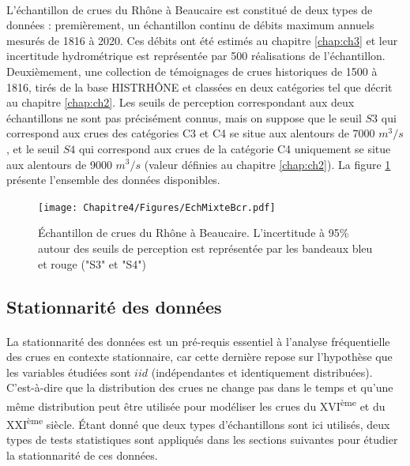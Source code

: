 	\paragraph{} L'échantillon de crues du Rhône à Beaucaire est constitué de deux types de données : premièrement, un échantillon continu de débits maximum annuels mesurés de 1816 à 2020. Ces débits ont été estimés au chapitre \ref{chap:ch3} et leur incertitude hydrométrique est représentée par 500 réalisations de l'échantillon. Deuxièmement, une collection de témoignages de crues historiques de 1500 à 1816, tirés de la base HISTRHÔNE et classées en deux catégories tel que décrit au chapitre \ref{chap:ch2}. Les seuils de perception correspondant aux deux échantillons ne sont pas précisément connus, mais on suppose que le seuil $S3$ qui correspond aux crues des catégories C3 et C4 se situe aux alentours de 7000 $m^3/s$, et le seuil $S4$ qui correspond aux crues de la catégorie C4 uniquement se situe aux alentours de 9000 $m^3/s$ (valeur définies au chapitre \ref{chap:ch2}). La figure \ref{fig:EchMixte} présente l'ensemble des données disponibles. 
	
	\begin{figure}[h]
		\texttt{[image: Chapitre4/Figures/EchMixteBcr.pdf]}	
		\caption{Échantillon de crues du Rhône à Beaucaire. L'incertitude à 95\% autour des seuils de perception est représentée par les bandeaux bleu et rouge ("S3" et "S4")}
		\label{fig:EchMixte}
	\end{figure}
	
\newpage
	\subsection{Stationnarité des données}
	\label{subsec:homog}
	\paragraph{} La stationnarité des données est un pré-requis essentiel à l'analyse fréquentielle des crues en contexte stationnaire, car cette dernière repose sur l'hypothèse que les variables étudiées sont $iid$ (indépendantes et identiquement distribuées). C'est-à-dire que la distribution des crues ne change pas dans le temps et qu'une même distribution peut être utilisée pour modéliser les crues du XVI\textsuperscript{ème} et du XXI\textsuperscript{ème} siècle. Étant donné que deux types d'échantillons sont ici utilisés, deux types de tests statistiques sont appliqués dans les sections suivantes pour étudier la stationnarité de ces données. 

